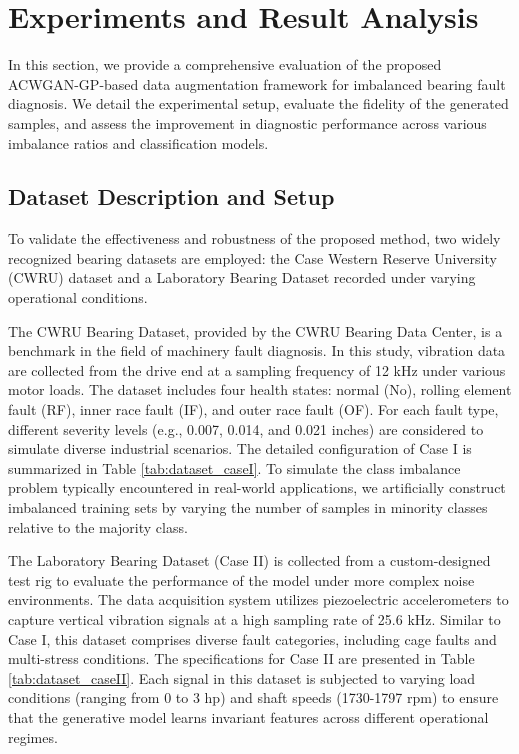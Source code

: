 \section{Experiments and Result Analysis}
In this section, we provide a comprehensive evaluation of the proposed ACWGAN-GP-based data augmentation framework for imbalanced bearing fault diagnosis. We detail the experimental setup, evaluate the fidelity of the generated samples, and assess the improvement in diagnostic performance across various imbalance ratios and classification models.

\subsection{Dataset Description and Setup}
To validate the effectiveness and robustness of the proposed method, two widely recognized bearing datasets are employed: the Case Western Reserve University (CWRU) dataset \cite{Smith2015} and a Laboratory Bearing Dataset recorded under varying operational conditions.

The CWRU Bearing Dataset, provided by the CWRU Bearing Data Center, is a benchmark in the field of machinery fault diagnosis. In this study, vibration data are collected from the drive end at a sampling frequency of 12 kHz under various motor loads. The dataset includes four health states: normal (No), rolling element fault (RF), inner race fault (IF), and outer race fault (OF). For each fault type, different severity levels (e.g., 0.007, 0.014, and 0.021 inches) are considered to simulate diverse industrial scenarios. The detailed configuration of Case I is summarized in Table \ref{tab:dataset_caseI}. To simulate the class imbalance problem typically encountered in real-world applications, we artificially construct imbalanced training sets by varying the number of samples in minority classes relative to the majority class.

The Laboratory Bearing Dataset (Case II) is collected from a custom-designed test rig to evaluate the performance of the model under more complex noise environments. The data acquisition system utilizes piezoelectric accelerometers to capture vertical vibration signals at a high sampling rate of 25.6 kHz. Similar to Case I, this dataset comprises diverse fault categories, including cage faults and multi-stress conditions. The specifications for Case II are presented in Table \ref{tab:dataset_caseII}. Each signal in this dataset is subjected to varying load conditions (ranging from 0 to 3 hp) and shaft speeds (1730-1797 rpm) to ensure that the generative model learns invariant features across different operational regimes.

